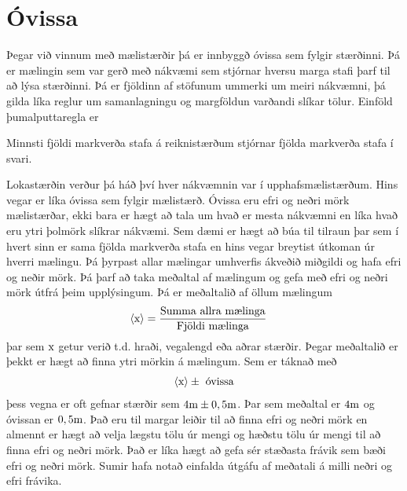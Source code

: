 \section{Óvissa}
Þegar við vinnum með mælistærðir  þá er innbyggð
óvissa sem fylgir stærðinni. Þá er mælingin sem var gerð með
nákvæmi sem stjórnar hversu marga stafi þarf til að lýsa stærðinni.
Þá er fjöldinn af stöfunum ummerki um meiri nákvæmni, þá gilda
líka reglur um samanlagningu og margföldun varðandi slíkar tölur.
Einföld þumalputtaregla er
\begin{formalstatement}
	Minnsti fjöldi markverða stafa á reiknistærðum stjórnar fjölda
	markverða stafa í svari.
\end{formalstatement}
Lokastærðin verður þá háð því hver nákvæmnin var í upphafsmælistærðum. 
Hins vegar er líka óvissa sem fylgir mælistærð. Óvissa eru efri og neðri
mörk mælistærðar, ekki bara er hægt að tala um hvað er mesta nákvæmni
en líka hvað eru ytri þolmörk slíkrar nákvæmi. Sem dæmi er hægt að
búa til tilraun þar sem í hvert sinn er sama fjölda markverða stafa
en hins vegar breytist útkoman úr hverri mælingu. Þá þyrpast allar
mælingar umhverfis ákveðið miðgildi og hafa efri og neðir mörk. Þá þarf
að taka meðaltal af mælingum og gefa með efri og neðri mörk útfrá
þeim upplýsingum. Þá er meðaltalið af öllum mælingum
\begin{align}
	\left<{\text{x}}\right> &= 
		\frac{
		\text{Summa allra mælinga} 
		}{
		\text{Fjöldi mælinga}
		}
\end{align}
þar sem $\text{x}$ getur verið t.d. hraði, vegalengd eða aðrar stærðir. Þegar
meðaltalið er þekkt er hægt að finna ytri mörkin á mælingum. Sem er
táknað með
\begin{align}
	\left< \text{x} \right> \pm \text{ óvissa}
\end{align}
þess vegna er oft gefnar stærðir sem $4 \textrm{m} \pm 0,5 \textrm{m}$. Þar
sem meðaltal er $4 \textrm{m}$ og óvissan er $0,5 \textrm{m}$. Það eru til
margar leiðir til að finna efri og neðri mörk en almennt er hægt að
velja lægstu tölu úr mengi og hæðstu tölu úr mengi til að finna
efri og neðri mörk. Það er líka hægt að gefa sér stæðasta frávik 
sem bæði efri og neðri mörk.
Sumir hafa notað einfalda útgáfu af meðatali á milli neðri og efri frávika.


